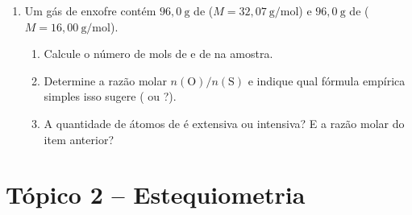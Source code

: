 \documentclass[10pt,a4paper]{article}
\begin{document}
\begin{enumerate}
\item Um gás de enxofre contém $96{,}0~\text{g}$ de 
  ($M = 32{,}07~\text{g/mol}$) e $96{,}0~\text{g}$ de 
  ($M = 16{,}00~\text{g/mol}$).
  \begin{enumerate}
    \item Calcule o número de mols de  e de  na amostra.
    \item Determine a razão molar $n(\text{O})/n(\text{S})$ e
          indique qual fórmula empírica simples isso sugere
          ( ou ?).
    \item A quantidade de átomos de  é extensiva ou intensiva?
          E a razão molar do item anterior?
  \end{enumerate}

\end{enumerate}

\newpage
\section*{Tópico 2 \; -- \; Estequiometria}
\end{document}
